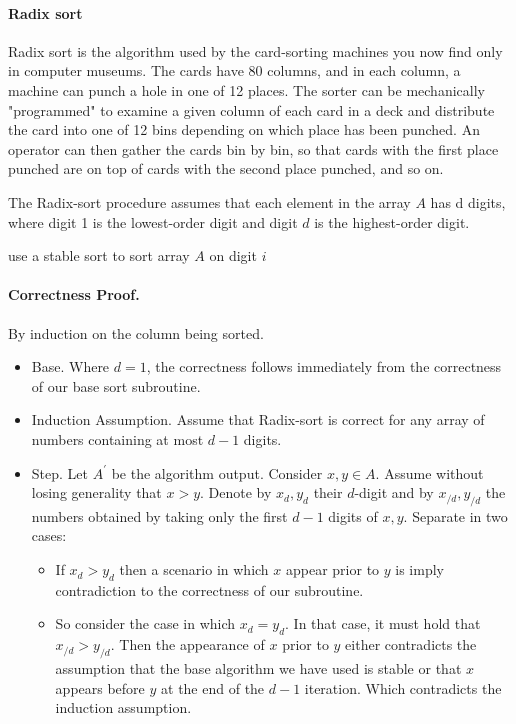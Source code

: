 \paragraph{Radix sort}
 Radix sort is the algorithm used by the card-sorting machines you now find only in computer museums. The cards have 80 columns, and in each column, a machine can punch a hole in one of 12 places. The sorter can be mechanically "programmed" to examine a given column of each card in a deck and distribute the card into one of 12 bins depending on which place has been punched. An operator can then gather the cards bin by bin, so that cards with the first place punched are on top of cards with the second place punched, and so on.

The Radix-sort procedure assumes that each element in the array $A$ has d digits, where digit 1 is the lowest-order digit and digit $d$ is the highest-order digit.


  \begin{algorithm}
     {
        use a stable sort to sort array $A$ on digit $i$
    }
\caption{radix-sort($A$, $n$, $d$)}
  \end{algorithm}

\paragraph{Correctness Proof.} By induction on the column being sorted.
\begin{itemize}
  \item Base. Where $d = 1$, the correctness follows immediately from the correctness of our base sort subroutine. 
  \item Induction Assumption. Assume that Radix-sort is correct for any array of numbers containing at most $d-1$ digits. 
  \item Step. Let $A^{\prime}$  be the algorithm output. Consider $x,y \in A$. Assume without losing generality that $x > y$. Denote by $x_{d}, y_{d}$ their $d$-digit and by $x_{/d}, y_{/d}$ the numbers obtained by taking only the first  $d-1$ digits of $x,y$. Separate in two cases:

    \begin{itemize}
      \item   If $x_{d} > y_{d}$ then a scenario in which $x$ appear prior to $y$ is  imply contradiction to the correctness of our subroutine.
      \item   So consider the case in which $x_{d} = y_{d}$. In that case, it must hold that $x_{/d} > y_{/d}$. Then the appearance of $x$ prior to $y$ either contradicts the assumption that the base algorithm we have used is stable or that $x$ appears before $y$ at the end of the $d-1$ iteration. Which contradicts the induction assumption. 
    \end{itemize}
 \end{itemize}

